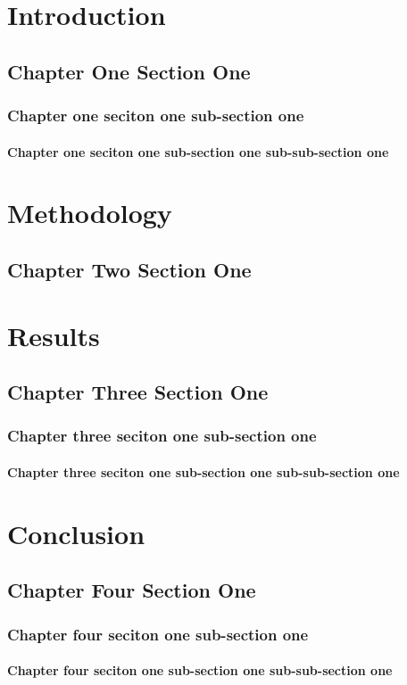 \chapter{Introduction}
\section{Chapter One Section One}
\subsection{Chapter one seciton one sub-section one}
\subsubsection{Chapter one seciton one sub-section one sub-sub-section one}

\chapter{Methodology}
\section{Chapter Two Section One}

\chapter{Results}
\section{Chapter Three Section One}
\subsection{Chapter three seciton one sub-section one}
\subsubsection{Chapter three seciton one sub-section one sub-sub-section one}


\chapter{Conclusion}
\section{Chapter Four Section One}
\subsection{Chapter four seciton one sub-section one}
\subsubsection{Chapter four seciton one sub-section one sub-sub-section one}

